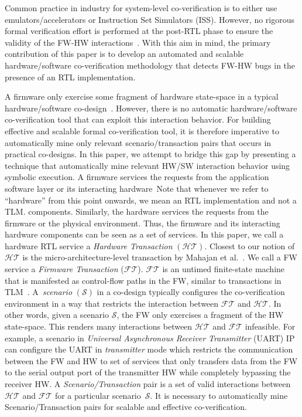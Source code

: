 \documentclass[sigconf]{acmart}
\begin{document}
Common practice in industry for system-level co-verification is to 
either use emulators/accelerators or Instruction Set Simulators (ISS). 
However, no rigorous formal verification effort is
performed at the post-RTL phase to ensure the validity of the
FW-HW interactions~\cite{vlsid13}.  With this aim in mind, the
primary contribution of this paper is to develop an automated and scalable
hardware/software co-verification methodology that detects FW-HW bugs in the 
presence of an RTL implementation.  

A firmware only exercise some fragment of hardware state-space in a typical hardware/software co-design~\cite{dac17,taa,ibm-other}.  However, there is no automatic hardware/software co-verification tool that can exploit this interaction behavior.  For building effective and scalable formal co-verification tool, it is therefore imperative to automatically mine only relevant scenario/transaction pairs that occurs in practical co-designs.  In this paper, we attempt to bridge this gap by presenting a technique that automatically mine relevant HW/SW interaction behavior using symbolic execution.
A firmware services the requests from
the application software layer or its interacting hardware~\footnotesize{Note that whenever we refer to ``hardware'' from this point onwards, we mean
an RTL implementation and not a TLM.}  components. 
Similarly, the hardware services the requests from the firmware or the
physical environment.  Thus, the firmware and its interacting hardware
components can be seen as a set of services.  In this paper, we call a
hardware RTL service a {\em Hardware Transaction} $(\mathcal{HT})$.  Closest
to our notion of $\mathcal{HT}$ is the micro-architecture-level transaction
by Mahajan et al.~\cite{mcbmq}.  We call a FW service a {\em Firmware
Transaction} ($\mathcal{FT}$).  $\mathcal{FT}$ is an untimed finite-state
machine that is manifested as control-flow paths in the FW, similar to
transactions in TLM~\cite{codes14}.  A~{\em scenario} $(\mathcal{S})$ in a
co-design typically configures the co-verification environment in a way that
restricts the interaction between $\mathcal{FT}$ and $\mathcal{HT}$.  In
other words, given a scenario $\mathcal{S}$, the FW only exercises a fragment
of the HW state-space.  This renders many interactions between
$\mathcal{HT}$ and $\mathcal{FT}$ infeasible. For example, a scenario in \emph{Universal Asynchronous Receiver Transmitter} (UART) IP can configure the UART in \emph{transmitter} mode which restricts the communication between the FW and HW to set of services that only transfers data from the FW to the serial output port of the transmitter HW while completely bypassing the receiver HW.    A {\em Scenario/Transaction}
pair is a set of valid interactions between $\mathcal{HT}$ and
$\mathcal{FT}$ for a particular scenario~$\mathcal{S}$.  
It is necessary to automatically mine Scenario/Transaction pairs for scalable and effective co-verification.
\end{document}
